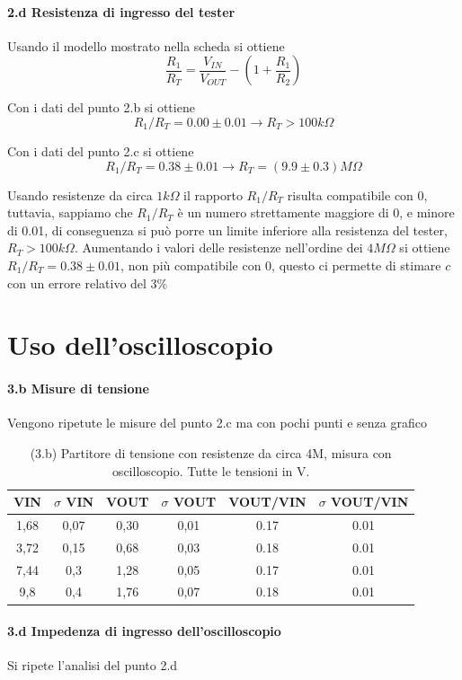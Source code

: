 \documentclass[10pt,a4paper]{article}
\begin{document}
\paragraph{2.d Resistenza di ingresso del tester}
Usando il modello mostrato nella scheda si ottiene
\[ \frac{R_1}{R_T} =  \frac{V_{IN}}{V_{OUT}} - (1 +  \frac{R_1}{R_2} )
\]

Con i dati del punto 2.b si ottiene
\[ R_1/R_T = 0.00  \pm  0.01   \rightarrow  R_T > 100 k\Omega
\]


Con i dati del punto 2.c si ottiene
\[ R_1/R_T = 0.38  \pm  0.01   \rightarrow  R_T = ( 9.9\pm  0.3)  M\Omega
\]

Usando resistenze da circa $1 k\Omega$ il rapporto $R_1/R_T$ risulta compatibile con 0, tuttavia, sappiamo che $R_1/R_T$ è un numero strettamente maggiore di 0, e minore di 0.01, di conseguenza si può porre un limite inferiore alla resistenza del tester, $R_T>100 k\Omega$. Aumentando i valori delle resistenze nell'ordine dei $4M\Omega$ si ottiene $R_1/R_T = 0.38  \pm  0.01$, non più compatibile con 0, questo ci permette di stimare $c$  con un errore relativo del $3\%$


\section{Uso dell'oscilloscopio}

\paragraph{3.b Misure di tensione} 
Vengono ripetute le misure del punto 2.c  ma con pochi punti e senza grafico
\begin{table}[h]
\centering
\begin{tabular}{|c|c|c|c|c|c|}
\hline 
VIN& $\sigma$ VIN  &VOUT	 & $\sigma$ VOUT& VOUT/VIN & $\sigma$ VOUT/VIN \\
\hline 
1,68 & 0,07 & 0,30 & 0,01 & 0.17 & 0.01\\
3,72 & 0,15 & 0,68 & 0,03 & 0.18 & 0.01 \\
7,44 & 0,3 & 1,28 & 0,05 & 0.17 & 0.01 \\
9,8 & 0,4 & 1,76 & 0,07 & 0.18 & 0.01 \\
\hline 
\end{tabular} 
\caption{(3.b) Partitore di tensione con resistenze da circa 4M, misura con oscilloscopio. Tutte le tensioni in V.}
\end{table}


\paragraph{3.d Impedenza di ingresso dell'oscilloscopio} Si ripete l'analisi del punto 2.d
\end{document}
